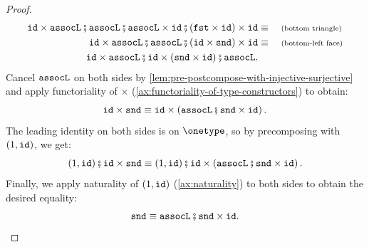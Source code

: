 \begin{proof}
\begin{align*}
        \idterm \times \assoclterm \comp \assoclterm \comp \assoclterm \times \idterm \comp \left( \fstterm \times \idterm \right) \times \idterm \equalbecause{bottom triangle} \\ 
        \idterm \times \assoclterm \comp \assoclterm \comp \left( \idterm \times \sndterm \right) \times \idterm \equalbecause{bottom-left face} \\ 
        \idterm \times \assoclterm \comp \idterm \times \left( \sndterm \times \idterm \right) \comp \assoclterm.
    \end{align*}
    Cancel $\mathtt{assocL}$ on both sides by \cref{lem:pre-postcompose-with-injective-surjective} and apply functoriality of $\times$ (\cref{ax:functoriality-of-type-constructors}) to obtain:
    \[
        \idterm \times \sndterm \equiv \idterm \times \left( \assoclterm \comp \sndterm \times \idterm \right).
    \]
    The leading identity on both sides is on $\onetype$, so by precomposing with $(1, \mathtt{id})$, we get:
    \[
        \unitlterm \comp \idterm \times \sndterm \equiv \unitlterm \comp \idterm \times \left( \assoclterm \comp \sndterm \times \idterm \right).
    \]
    Finally, we apply naturality of $(1, \mathtt{id})$ (\cref{ax:naturality}) to both sides to obtain the desired equality:
    \[
        \sndterm \equiv \assoclterm \comp \sndterm \times \idterm.
    \]
\end{proof}

